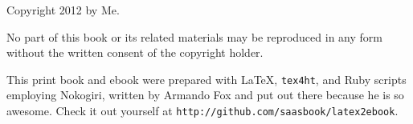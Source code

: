 
\thispagestyle{empty}%
\ifhtmloutput
  \ifmobioutput
  \else
    \subsubsection*{}
  \fi
\fi


Copyright 2012 by Me.

No part of this book or its related materials may be reproduced in any
form without the written consent of the copyright holder.

\vfill

This print book and ebook were prepared with \LaTeX{},
\texttt{tex4ht}, and Ruby scripts employing Nokogiri, written by Armando Fox
and put out there because he is so awesome.    
Check it out yourself at
\texttt{http://github.com/saasbook/latex2ebook}.


\ifhtmloutput
  \ifmobioutput
  \else
  \fi
\fi
